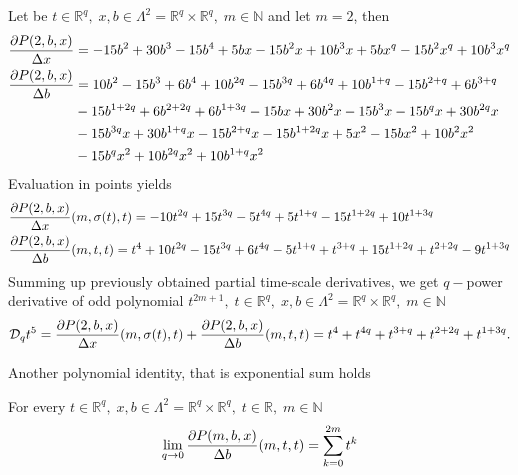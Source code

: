 \begin{examp}
    \label{time_scale_nq_example_2}
    Let be $t\in {\mathbb{R}}^{q}, \; x,b\in\Lambda^2 = {\mathbb{R}}^{q} \times {\mathbb{R}}^{q}, \; m\in\mathbb{N}$ and let $m=2$, then
    \begin{align*}
        \frac{\partial P ( 2, b, x )}{\Delta x}
        &= -15 b^2 + 30 b^3 - 15 b^4 + 5 b x - 15 b^2 x + 10 b^3 x + 5 b x^q - 15 b^2 x^q + 10 b^3 x^q \\
        \frac{\partial P ( 2, b, x )}{\Delta b}
        &= 10 b^2 - 15 b^3 + 6 b^4 + 10 b^{2 q} - 15 b^{3 q} + 6 b^{4 q}
        + 10 b^{1 + q} - 15 b^{2 + q} + 6 b^{3 + q} \\
        &- 15 b^{1 + 2 q} + 6 b^{2 + 2 q} + 6 b^{1 + 3 q} - 15 b x + 30 b^2 x - 15 b^3 x
        - 15 b^q x + 30 b^{2 q} x \\
        &- 15 b^{3 q} x + 30 b^{1 + q} x - 15 b^{2 + q} x - 15 b^{1 + 2 q} x + 5 x^2 - 15 b x^2 + 10 b^2 x^2 \\
        &- 15 b^q x^2 + 10 b^{2 q} x^2 + 10 b^{1 + q} x^2
    \end{align*}
    Evaluation in points yields
    \begin{align*}
        &\frac{\partial P ( 2, b, x )}{\Delta x} (m, \sigma(t), t)
        = -10 t^{2 q} + 15 t^{3q} - 5 t^{4q} + 5 t^{1+q} - 15 t^{1+2q} + 10 t^{1 + 3 q} \\
        &\frac{\partial P ( 2, b, x )}{\Delta b} (m, t, t)
        = t^4 + 10 t^{2 q} - 15 t^{3 q} + 6 t^{4 q} - 5 t^{1 + q} + t^{3 + q}
        + 15 t^{1 + 2 q} + t^{2 + 2 q} - 9 t^{1 + 3 q}
    \end{align*}
    Summing up previously obtained partial time-scale derivatives, we get $q-$power derivative of odd polynomial
    $t^{2m+1}, \; t\in {\mathbb{R}}^{q}, \; x,b\in\Lambda^2 = {\mathbb{R}}^{q} \times {\mathbb{R}}^{q}, \; m\in\mathbb{N}$
    \begin{align*}
        \mathcal{D}_q t^{5}
        = \frac{\partial P ( 2, b, x )}{\Delta x} (m, \sigma(t), t)
        + \frac{\partial P ( 2, b, x )}{\Delta b} (m, t, t)
        = t^4 + t^{4 q} + t^{3 + q} + t^{2 + 2 q} + t^{1 + 3 q}.
    \end{align*}
\end{examp}
Another polynomial identity, that is exponential sum holds
\begin{cor}
    \label{time_scale_nq_corollary_1}
    For every $t\in {\mathbb{R}}^{q}, \; x,b\in\Lambda^2 = {\mathbb{R}}^{q} \times {\mathbb{R}}^{q}, \; t\in\mathbb{R}, \; m\in\mathbb{N}$
    \begin{align*}
        \lim \limits_{q \to 0} \frac{\partial P ( m, b, x )}{\Delta b} (m, t, t)
        = \sum_{k=0}^{2m} t^k
    \end{align*}
\end{cor}
